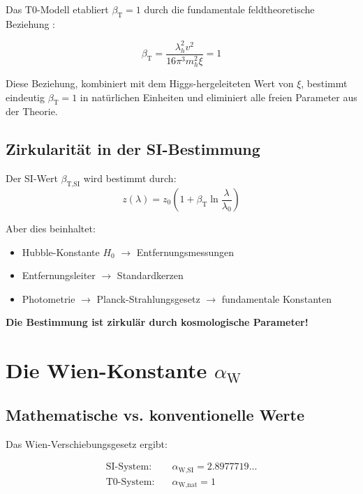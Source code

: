 \documentclass[12pt,a4paper]{article}
\newcommand{\xipar}{\xi}
\newcommand{\lambdah}{\lambda_h}
\newcommand{\pichar}{\pi}
\newcommand{\betaTSI}{\beta_{\text{T,SI}}}
\newcommand{\alphaWSI}{\alpha_{\text{W,SI}}}
\newcommand{\alphaWnat}{\alpha_{\text{W,nat}}}
\begin{document}
	Das T0-Modell etabliert $\beta_{\text{T}} = 1$ durch die fundamentale feldtheoretische Beziehung \cite{pascher_derivation_beta_2025}:
	
	\begin{equation}
		\beta_{\text{T}} = \frac{\lambdah^2 v^2}{16\pichar^3 m_h^2 \xipar} = 1
		\label{eq:beta_t_feldtheorie}
	\end{equation}
	
	Diese Beziehung, kombiniert mit dem Higgs-hergeleiteten Wert von $\xipar$, bestimmt eindeutig $\beta_{\text{T}} = 1$ in natürlichen Einheiten und eliminiert alle freien Parameter aus der Theorie.
	
	\subsection{Zirkularität in der SI-Bestimmung}
	\label{subsec:beta_zirkularitaet}
	
	Der SI-Wert $\betaTSI$ wird bestimmt durch:
	$$z(\lambda) = z_0\left(1 + \beta_{\text{T}} \ln\frac{\lambda}{\lambda_0}\right)$$
	
	Aber dies beinhaltet:
	\begin{itemize}
		\item Hubble-Konstante $H_0$ $\rightarrow$ Entfernungsmessungen
		\item Entfernungsleiter $\rightarrow$ Standardkerzen
		\item Photometrie $\rightarrow$ Planck-Strahlungsgesetz $\rightarrow$ fundamentale Konstanten
	\end{itemize}
	
	\textbf{Die Bestimmung ist zirkulär durch kosmologische Parameter!}
	
	\section{Die Wien-Konstante $\alpha_{\text{W}}$}
	\label{sec:alpha_w}
	
	\subsection{Mathematische vs. konventionelle Werte}
	\label{subsec:wien_werte}
	
	Das Wien-Verschiebungsgesetz ergibt:
	
	\begin{align}
		\text{SI-System:} \quad &\alphaWSI = 2.8977719... \\
		\text{T0-System:} \quad &\alphaWnat = 1
	\end{align}
	
\end{document}
